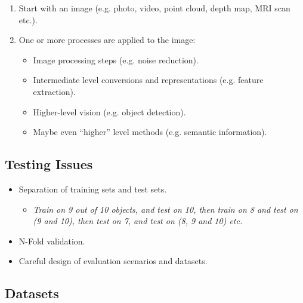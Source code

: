 \documentclass[english, 10pt]{article}
\begin{document}
\begin{enumerate}
\item Start with an image (e.g. photo, video, point cloud, depth map, MRI scan etc.).
\item One or more processes are applied to the image:
\begin{itemize}
\item Image processing steps (e.g. noise reduction).
\item Intermediate level conversions and representations (e.g. feature extraction).
\item Higher-level vision (e.g. object detection).
\item Maybe even ``higher'' level methods (e.g. semantic information).
\end{itemize}
\end{enumerate}

\subsection{Testing Issues}

\begin{itemize}
\item Separation of training sets and test sets.
\begin{itemize}
\item \textit{Train on 9 out of 10 objects, and test on 10, then train on 8 and test on (9 and 10), then test on 7, and test on (8, 9 and 10) etc.}
\end{itemize}
\item N-Fold validation.
\item Careful design of evaluation scenarios and datasets.
\end{itemize}

%

\subsection{Datasets}
\end{document}
